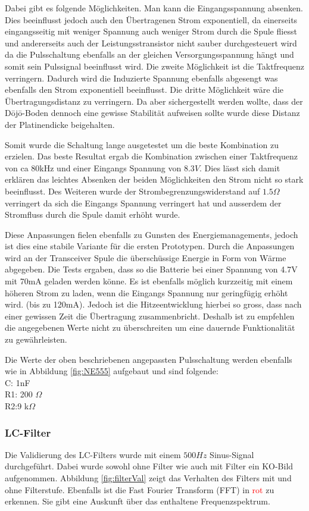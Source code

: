 Dabei gibt es folgende Möglichkeiten. Man kann die Eingangsspannung absenken. Dies beeinflusst jedoch auch den Übertragenen Strom exponentiell, da einerseits eingangsseitig mit weniger Spannung auch weniger Strom durch die Spule fliesst und andererseits auch der Leistungsstransistor nicht sauber durchgesteuert wird da die Pulsschaltung ebenfalls an der gleichen Versorgungsspannung hängt und somit sein Pulssignal beeinflusst wird. Die zweite Möglichkeit ist die Taktfrequenz verringern. Dadurch wird die Induzierte Spannung ebenfalls abgesengt was ebenfalls den Strom exponentiell beeinflusst. Die dritte Möglichkeit wäre die Übertragungsdistanz zu verringern. Da aber sichergestellt werden wollte, dass der Dōjō-Boden dennoch eine gewisse Stabilität aufweisen sollte wurde diese Distanz der Platinendicke beigehalten.

Somit wurde die Schaltung lange ausgetestet um die beste Kombination zu erzielen. Das beste Resultat ergab die Kombination zwischen einer Taktfrequenz von ca 80kHz und einer Eingangs Spannung von $8.3V$. Dies lässt sich damit erklären das leichtes Absenken der beiden Möglichkeiten den Strom nicht so stark beeinflusst. Des Weiteren wurde der Strombegrenzungswiderstand auf $1.5\Omega$ verringert da sich die Eingangs Spannung verringert hat und ausserdem der Stromfluss durch die Spule damit erhöht wurde. 

Diese Anpassungen fielen ebenfalls zu Gunsten des Energiemanagements, jedoch ist dies eine stabile Variante für die ersten Prototypen. Durch die Anpassungen wird an der Transceiver Spule die überschüssige Energie in Form von Wärme  abgegeben. Die Tests ergaben, dass so die Batterie bei einer Spannung von 4.7V mit 70mA geladen werden könne. Es ist ebenfalls möglich kurzzeitig mit einem höheren Strom zu laden, wenn die Eingangs Spannung nur geringfügig erhöht wird. (bis zu 120mA). Jedoch ist die Hitzeentwicklung hierbei so gross, dass nach einer gewissen Zeit die Übertragung zusammenbricht. Deshalb ist zu empfehlen die angegebenen Werte nicht zu überschreiten um eine dauernde Funktionalität zu gewährleisten.

Die Werte der oben beschriebenen angepassten Pulsschaltung werden ebenfalls wie in Abbildung \ref{fig:NE555} aufgebaut und sind folgende:\\
C: 1nF\\
R1: 200 $\Omega$\\
R2:9 k$\Omega$\\


\subsubsection*{LC-Filter} \label{sec:Validierung LC-Filter}
Die Validierung des LC-Filters wurde mit einem $500Hz$ Sinus-Signal durchgeführt. Dabei wurde sowohl ohne Filter wie auch mit Filter ein KO-Bild aufgenommen. Abbildung \ref{fig:filterVal} zeigt das Verhalten des Filters mit und ohne Filterstufe. Ebenfalls ist die Fast Fourier Transform (FFT) in \textcolor{red}{rot} zu erkennen. Sie gibt eine Auskunft über das enthaltene Frequenzspektrum.

